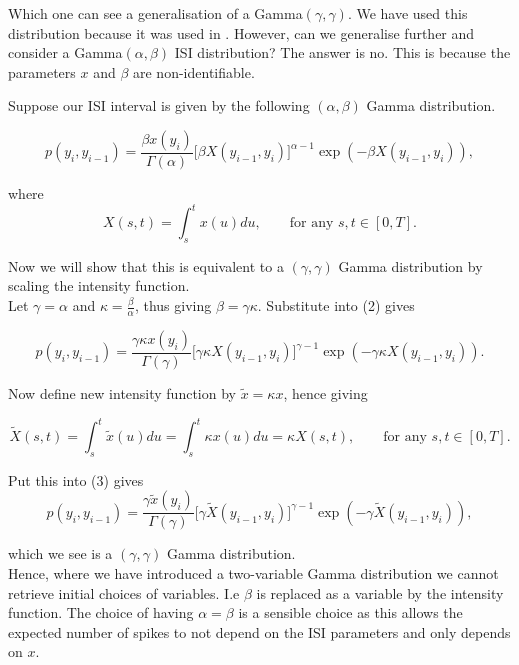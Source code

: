 \documentclass[../main.tex]{subfiles}
\begin{document}
 Which one can see a generalisation of a Gamma$(\gamma,\gamma)$. We have used this distribution because it was used in \cite{}. However, can we generalise further and consider a Gamma$(\alpha,\beta)$ ISI distribution? The answer is no. This is because the parameters $x$ and $\beta$ are non-identifiable.  \\
 
{\color{blue}
Suppose our ISI interval is given by the following $(\alpha, \beta )$ Gamma distribution. 

\begin{equation}
 p(y_i, y_{i-1}) =  \frac{\beta x(y_i)}{\Gamma ( \alpha )} \big[ \beta X(y_{i-1} , y_i ) \big]^{\alpha -1} \exp( - \beta X(y_{i-1} , y_i )  ),
 \end{equation}
 
 where 
  \begin{equation}
X(s,t) = \int^{t}_{s} x(u) du , \qquad \text{for any } s,t \in [0,T].
\end{equation}
 
 Now we will show that this is equivalent to a $(\gamma, \gamma)$ Gamma distribution by scaling the intensity function.\\
 
 Let $\gamma = \alpha$ and $\kappa = \frac{\beta}{\alpha}$, thus giving $\beta = \gamma \kappa$. Substitute into (2) gives
 
 \begin{equation}
 p(y_i, y_{i-1}) =  \frac{\gamma \kappa x(y_i)}{\Gamma ( \gamma )} \big[ \gamma \kappa X(y_{i-1} , y_i ) \big]^{\gamma -1} \exp( - \gamma \kappa X(y_{i-1} , y_i )  ).
 \end{equation}
 
 Now define new intensity function by $\tilde x = \kappa x$, hence giving
 
   \begin{equation}
\tilde X(s,t) = \int^{t}_{s} \tilde x(u) du = \int^{t}_{s} \kappa x(u) du =  \kappa X(s,t)  , \qquad \text{for any } s,t \in [0,T].
\end{equation}

Put this into (3) gives
 \begin{equation}
 p(y_i, y_{i-1}) =  \frac{\gamma  \tilde x(y_i)}{\Gamma ( \gamma )} \big[ \gamma \tilde X(y_{i-1} , y_i ) \big]^{\gamma -1} \exp( - \gamma \tilde X(y_{i-1} , y_i )  ),
 \end{equation}
 
 which we see is a $(\gamma, \gamma)$ Gamma distribution. \\
 
 Hence, where we have introduced a two-variable Gamma distribution we cannot retrieve initial choices of variables. I.e $\beta$ is replaced as a variable by the intensity function. The choice of having $\alpha = \beta$ is a sensible choice as this allows the expected number of spikes to not depend on the ISI parameters and only depends on $x$.
 }
 
\end{document}
